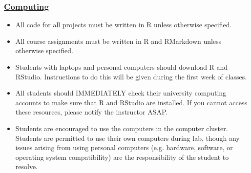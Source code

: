 \documentclass[11pt]{article}
\begin{document}
\subsubsection*{\underline{Computing}}
\begin{itemize}
	\item All code for all projects must be written in R unless otherwise specified.  
	
	\item All course assignments must be written in R and RMarkdown unless otherwise specified.
	
	\item Students with laptops and personal computers should download R and RStudio.  Instructions to do this will be given during the first week of classes.
	
	\item All students should IMMEDIATELY check their university computing accounts to make sure that R and RStudio are installed.  If you cannot access these resources, please notify the instructor ASAP.
	
	\item Students are encouraged to use the computers in the computer cluster.  Students are permitted to use their own computers during lab, though any issues arising from using personal computers (e.g. hardware, software, or operating system compatibility) are the responsibility of the student to resolve.
	
\end{itemize}
\end{document}
